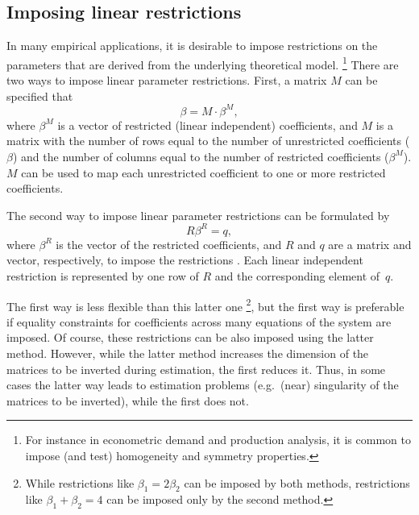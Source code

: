 \subsection{Imposing linear restrictions}\label{sec:Restrictions}

In many empirical applications,
it is desirable to impose restrictions on the parameters
that are derived from the underlying theoretical model.%
\footnote{%
For instance in econometric demand and production analysis,
it is common to impose (and test) homogeneity and symmetry properties.
}
There are two ways to impose linear parameter restrictions.
First, a matrix $M$ can be specified that
\begin{equation}
   \beta = M \cdot \beta^M \label{eq:T-restr} ,
\end{equation}
where $\beta^M$ is a vector of restricted (linear independent) coefficients,
and $M$ is a matrix with the number of rows equal to the number of
unrestricted coefficients ($\beta$) and
the number of columns equal to the number of restricted coefficients
($\beta^M$).
$M$ can be used to map each unrestricted coefficient to one or more
restricted coefficients.

The second way to impose linear parameter restrictions
can be formulated by
\begin{equation}
   R \beta^R = q ,
   \label{eq:restr-R}
\end{equation}
where $\beta^R$ is the vector of the restricted coefficients,
and $R$ and $q$ are a matrix and vector, respectively,
to impose the restrictions \citep[see][p.\ 100]{greene03}.
Each linear independent restriction is represented by one row of $R$
and the corresponding element of~$q$.

The first way is less flexible than this latter one%
\footnote{
While restrictions like $\beta_1 = 2 \beta_2$ can be imposed by
both methods,
restrictions like $\beta_1 + \beta_2 = 4$ can be imposed only
by the second method.
}, 
but the first way is preferable if equality constraints for coefficients
across many equations of the system are imposed. 
Of course, these restrictions can be also imposed using
the latter method.
However, while the latter method increases the dimension of the 
matrices to be inverted during estimation, the first reduces it. 
Thus, in some cases the latter way leads to estimation problems
(e.g.\ (near) singularity of the matrices to be inverted),
while the first does not.


